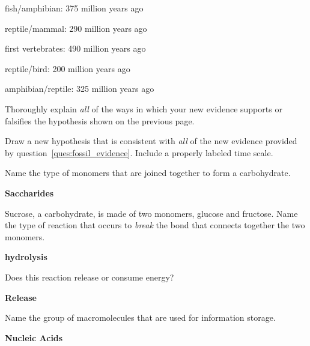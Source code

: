 \documentclass[11pt, addpoints]{exam}
\begin{document}
\begin{questions}
fish/amphibian: 375 million years ago

reptile/mammal: 290 million years ago

first vertebrates: 490 million years ago

reptile/bird: 200 million years ago

amphibian/reptile: 325 million years ago\vspace{\baselineskip}

Thoroughly explain \emph{all} of the ways in which your new evidence
supports or falsifies the hypothesis shown on the previous page.

\ifprintanswers
\else
\fi

\newpage

\question[7]
Draw a new hypothesis that is consistent with \emph{all} of the new evidence
provided by question~\ref{ques:fossil_evidence}. Include a properly labeled time
scale.

\ifprintanswers
\else
\fi

\question[2]
Name the type of monomers that are joined together to form a
carbohydrate.

\ifprintanswers
	\textbf{Saccharides}
\else
\fi

\question[2]
Sucrose, a carbohydrate, is made of two monomers, glucose and
fructose. Name the type of reaction that occurs to \emph{break} the bond
that connects together the two monomers.

\ifprintanswers
	\textbf{hydrolysis}
\else
\fi

\question[2]
Does this reaction release or consume energy?

\ifprintanswers
	\textbf{Release}
\else
\fi

\question[2]
Name the group of macromolecules that are used for information storage. 

\ifprintanswers
	\textbf{Nucleic Acids}
\else
\fi

\end{questions}
\end{document}
